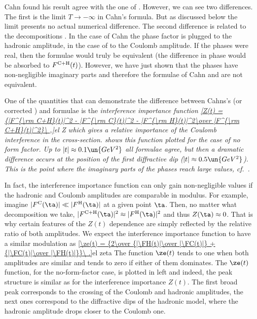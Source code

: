 
Cahn found his result  agree with the one of \WY{} . However, we can see two differences. The first is the limit $T\to -\infty$ in Cahn's formula. But as discussed below  the limit presents no actual numerical difference. The second difference is related to the decompositions . In the case of Cahn the phase factor is plugged to the hadronic amplitude, in the case of \WaY{} to the Coulomb amplitude. If the phases were real, then the formulae would truly be equivalent (the difference in phase would be absorbed to $F^{\rm C+H}(t)$). However, we have just shown that the phases have non-negligible imaginary parts and therefore the formulae of Cahn  and \WY{}  are not equivalent.

One of the quantities that can demonstrate the difference between Cahns's (or corrected \KL) and \WY{} formulae is the \em{interference importance} function
\eqref{Z(t) = {|F^{\rm C+H}(t)|^2 - |F^{\rm C}(t)|^2 - |F^{\rm H}(t)|^2\over |F^{\rm C+H}(t)|^2}\ ,}{el Z}
which gives a relative importance of the Coulomb interference in the cross-section.  shows this function plotted for the case of no form factor. Up to $|t| \approx 0.1\un{GeV^2}$ all formulae agree, but then a dramatic difference occurs at the position of the first diffractive dip ($|t|\approx 0.5\un{GeV^2}$). This is the point where the imaginary parts of the phases reach large values, cf.~.


In fact, the interference importance function can only gain non-negligible values if the hadronic and Coulomb amplitudes are comparable in modulus. For example, imagine $|\FC(\ta)| \ll |\FH(\ta)|$ at a given point $\ta$. Then, no matter what decomposition  we take, $|\FCH(\ta)|^2 \approx |\FH(\ta)|^2$ and thus $Z(\ta) \approx 0$. That is why certain features of the $Z(t)$ dependence are simply reflected by the relative ratio of both amplitudes. We expect the interference importance function to have a similar modulation as 
\eqref{\ze(t) = {2\over {|\FH(t)|\over |\FC(t)|} + {|\FC(t)|\over |\FH(t)|}}\ .}{el zeta}
The function $\ze(t)$ tends to one when both amplitudes are similar and tends to zero if either of them dominates. The $\ze(t)$ function, for the no-form-factor case, is plotted in  left and indeed, the peak structure is similar as for the interference importance $Z(t)$. The first broad peak corresponds to the crossing of the Coulomb and hadronic amplitudes, the next ones correspond to the diffractive dips of the hadronic model, where the hadronic amplitude drops closer to the Coulomb one.

